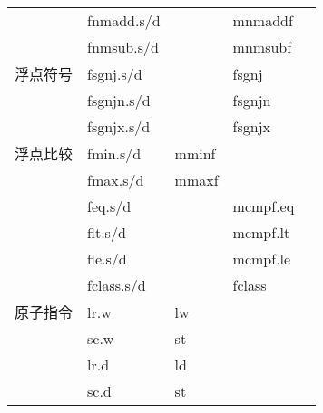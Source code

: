 \begin{longtable}{lllll}
                               & fnmadd.s/d                       &                              & mnmaddf                        \\
                               & fnmsub.s/d                       &                              & mnmsubf                        \\
                               \hline
    浮点符号                       & fsgnj.s/d                        &                              & fsgnj                          \\
                               & fsgnjn.s/d                       &                              & fsgnjn                         \\
                               & fsgnjx.s/d                       &                              & fsgnjx                         \\
                               \hline
    浮点比较                       & fmin.s/d                         & mminf                        &                                \\
                               & fmax.s/d                         & mmaxf                        &                                \\
                               & feq.s/d                          &                              & mcmpf.eq                       \\
                               & flt.s/d                          &                              & mcmpf.lt                       \\
                               & fle.s/d                          &                              & mcmpf.le                       \\
                               & fclass.s/d                       &                              & fclass                         \\
                               \hline
    原子指令                       & lr.w                             & lw                           &                                \\
                               & sc.w                             & st                           &                                \\
                               & lr.d                             & ld                           &                                \\
                               & sc.d                             & st                           &                                \\

\end{longtable}
